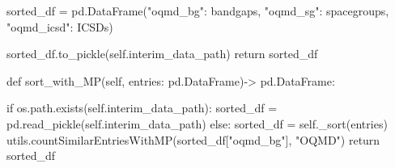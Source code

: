         sorted_df = pd.DataFrame({"oqmd_bg":   bandgaps,
                                  "oqmd_sg":   spacegroups,
                                  "oqmd_icsd": ICSDs})

        sorted_df.to_pickle(self.interim_data_path)
        return sorted_df

    def sort_with_MP(self, entries: pd.DataFrame)-> pd.DataFrame:

        if os.path.exists(self.interim_data_path):
            sorted_df = pd.read_pickle(self.interim_data_path)
        else:
            sorted_df = self._sort(entries)
        utils.countSimilarEntriesWithMP(sorted_df["oqmd_bg"], "OQMD")
        return sorted_df
